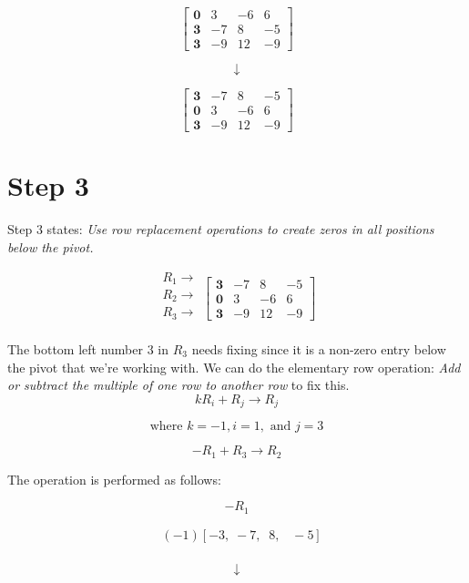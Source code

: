 \documentclass[
  letterpaper,
  DIV=11,
  numbers=noendperiod]{scrreprt}
\begin{document}
\[
\begin{bmatrix}
    \mathbf{0} & 3 & -6 & 6 \\
    \mathbf{3} & -7 & 8 & -5 \\
    \mathbf{3} & -9 & 12 & -9
\end{bmatrix}
\]

\[
\downarrow
\]

\[
\begin{bmatrix}
    \mathbf{3} & -7 & 8 & -5  \\
    \mathbf{0} & 3 & -6 & 6   \\
    \mathbf{3} & -9 & 12 & -9
\end{bmatrix}
\]

\chapter{Step 3}

Step 3 states: \emph{Use row replacement operations to create zeros in
all positions below the pivot.}

\[
\begin{array}{c}
    R_1\rightarrow\\
    R_2\rightarrow\\
    R_3\rightarrow\\
\end{array}
\left[\begin{array}{ccc}
    \mathbf{3} & -7 & 8 & -5  \\
    \mathbf{0} & 3 & -6 & 6   \\
    \mathbf{3} & -9 & 12 & -9
\end{array}\right]
\]

The bottom left number \(3\) in \(R_3\) needs fixing since it is a
non-zero entry below the pivot that we're working with. We can do the
elementary row operation: \emph{Add or subtract the multiple of one row
to another row} to fix this. \[
kR_i + R_j \rightarrow R_j
\]

\[
\text{where } k = -1, i = 1, \text{ and } j = 3
\]

\[
-R_1 + R_3 \rightarrow R_2
\]

The operation is performed as follows:

\[
-R_1
\]

\[
\begin{align*}
    &(-1)\left[ -3,  \;-7, \;\; 8, \;\;\; -5 \right] \\
\end{align*}
\]

\[
\downarrow
\]
\end{document}
